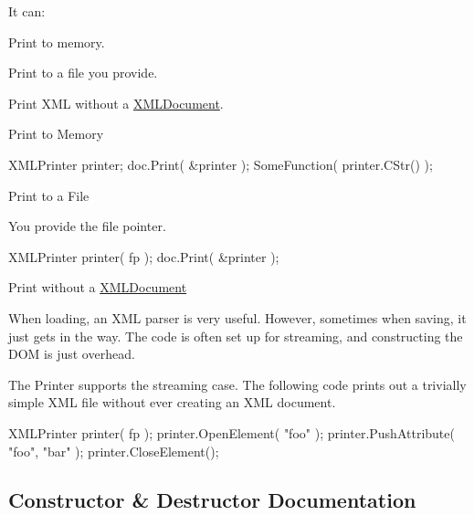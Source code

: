 It can\+:
\begin{DoxyEnumerate}
\item Print to memory.
\item Print to a file you provide.
\item Print X\+ML without a \hyperlink{classtinyxml2_1_1_x_m_l_document}{X\+M\+L\+Document}.
\end{DoxyEnumerate}

Print to Memory

\begin{DoxyVerb}XMLPrinter printer;
doc.Print( &printer );
SomeFunction( printer.CStr() );
\end{DoxyVerb}


Print to a File

You provide the file pointer. \begin{DoxyVerb}XMLPrinter printer( fp );
doc.Print( &printer );
\end{DoxyVerb}


Print without a \hyperlink{classtinyxml2_1_1_x_m_l_document}{X\+M\+L\+Document}

When loading, an X\+ML parser is very useful. However, sometimes when saving, it just gets in the way. The code is often set up for streaming, and constructing the D\+OM is just overhead.

The Printer supports the streaming case. The following code prints out a trivially simple X\+ML file without ever creating an X\+ML document.

\begin{DoxyVerb}XMLPrinter printer( fp );
printer.OpenElement( "foo" );
printer.PushAttribute( "foo", "bar" );
printer.CloseElement();
\end{DoxyVerb}
 

\subsection{Constructor \& Destructor Documentation}
